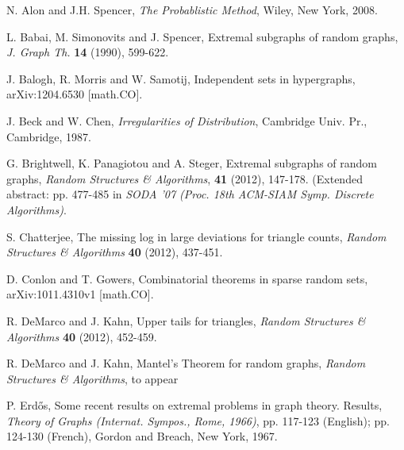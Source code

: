 \documentclass[letterpaper,11pt]{article}
\newcommand{\0}[0]{\emptyset}
\begin{document}
\begin{thebibliography}{99}
\label{refs}


 N. Alon and J.H. Spencer,
\emph{The Probablistic Method}, Wiley, New York, 2008.





L. Babai, M. Simonovits and J. Spencer,
Extremal subgraphs of random graphs,
{\em J. Graph Th.} {\bf 14} (1990), 599-622.

J. Balogh, R. Morris and W. Samotij,
Independent sets in hypergraphs,
arXiv:1204.6530 [math.CO].

 J. Beck and W. Chen,
{\em Irregularities of Distribution}, Cambridge Univ. Pr., Cambridge, 1987.



G. Brightwell, K. Panagiotou and A. Steger,
Extremal subgraphs of random graphs,
{\em Random Structures \& Algorithms},
{\bf 41} (2012), 147-178.
(Extended abstract: pp. 477-485 in
{\em SODA '07 (Proc. 18th ACM-SIAM Symp. Discrete Algorithms)}.

S. Chatterjee, The missing log in large deviations for triangle counts,
{\em Random Structures \& Algorithms} {\bf 40} (2012),  437-451.


 D. Conlon and T. Gowers,
Combinatorial theorems in sparse random sets,
arXiv:1011.4310v1 [math.CO].

R. DeMarco and J. Kahn,  Upper tails for triangles,
{\em Random Structures \& Algorithms} {\bf 40} (2012), 452-459.


  R. DeMarco and J. Kahn,
Mantel's Theorem for random graphs,
{\em Random Structures \& Algorithms}, to appear




 P. Erd\H{o}s,
Some recent results on extremal problems in graph theory. Results,
{\em Theory of Graphs (Internat. Sympos., Rome, 1966)}, pp. 117-123 (English); pp. 124-130 (French), Gordon and Breach, New York, 1967.


\end{thebibliography}
\end{document}
